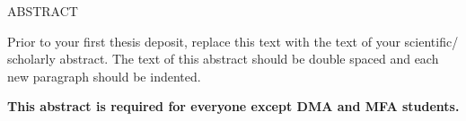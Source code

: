 \begin{doublespace}
\begin{tightcenter}
ABSTRACT
\mylinespacing
\end{tightcenter}

Prior to your first thesis deposit, replace this text with the text of your scientific/ scholarly abstract. The text of this abstract should be double spaced and each new paragraph should be indented. 

\mylinespacing
\mylinespacing
\begin{tightcenter}
\textbf{This abstract is required for everyone except DMA and MFA students.}
\end{tightcenter}
\end{doublespace}
